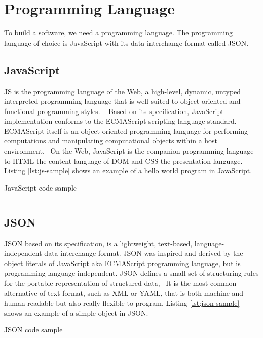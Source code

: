 \section{Programming Language}
\label{sec:programming}

To build a software, we need a programming language.
The programming language of choice is JavaScript with its data interchange format called JSON.

\subsection{JavaScript}

\ac{JS} is the programming language of the Web, a high-level, dynamic, untyped interpreted programming language that is well-suited to object-oriented and functional programming styles.
~\autocite{Flanagan:2011:JS}
Based on its specification, JavaScript implementation conforms to the ECMAScript\textsuperscript{\textregistered} scripting language standard.
ECMAScript itself is an object-oriented programming language for performing computations and manipulating computational objects within a host environment.~\autocite{ECMA:2011:ECMAScript}
On the Web, JavaScript is the companion programming language to \ac{HTML} the content language of \ac{DOM} and \ac{CSS} the presentation language.
Listing \autoref{lst:js-sample} shows an example of a hello world program in JavaScript.

\begin{listing}[ht]
\caption{JavaScript code sample}
\inputminted{javascript}{\dir/include/js-sample.js}
\label{lst:js-sample}
\end{listing}


\subsection{JSON}

\ac{JSON} based on its specification, is a lightweight, text-based, language-independent data interchange format.
\ac{JSON} was inspired and derived by the object literals of JavaScript aka ECMAScript programming language, but is programming language independent.
\ac{JSON} defines a small set of structuring rules for the portable representation of structured data,~\autocite{ECMA:2013:JSON}
It is the most common alternative of text format, such as \ac{XML} or \ac{YAML}, that is both machine and human-readable but also really flexible to program.
Listing \autoref{lst:json-sample} shows an example of a simple object in \ac{JSON}.

\begin{listing}[ht]
\caption{JSON code sample}
\inputminted{javascript}{\dir/include/json-sample.json}
\label{lst:json-sample}
\end{listing}
